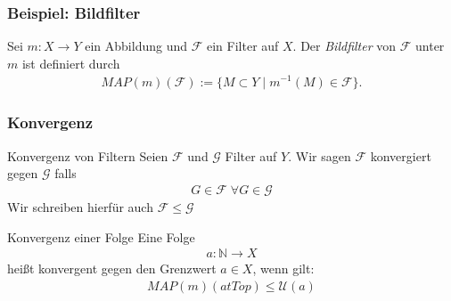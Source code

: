 \documentclass{beamer}
\begin{document}
\begin{frame}
    \frametitle{Beispiel: Bildfilter}
    Sei $m: X \to Y  $ ein Abbildung und $\mathcal{F}$ ein Filter auf $X$. Der \emph{Bildfilter} von $\mathcal{F}$ unter $m$ ist definiert durch 
    \begin{align}
        MAP(m)(\mathcal{F}) := \{ M \subset Y \mid m^{-1} (M) \in \mathcal{F} \}.
    \end{align}
\end{frame}

\begin{frame}
    \frametitle{Konvergenz}
    \begin{block}{Konvergenz von Filtern}
    Seien  $\mathcal{F}$ und $\mathcal{G}$ Filter auf $Y$. Wir sagen $\mathcal{F}$ konvergiert gegen  $\mathcal{G}$ falls
    \begin{align}
       G \in \mathcal{F} \; \forall G \in \mathcal{G}
    \end{align}
    Wir schreiben hierfür auch $\mathcal{F} \leq \mathcal{G}$
    \end{block}
 
    \begin{block}{Konvergenz einer Folge}
        Eine Folge
    \begin{align*}
            a: \mathbb{N} \rightarrow X
            \end{align*}
    heißt konvergent gegen  den Grenzwert $a \in X$, wenn gilt:
    \begin{align}  
        MAP(m)(atTop) \leq  \mathcal{U}(a)
    \end{align}
\end{block}

\end{frame}
\end{document}
